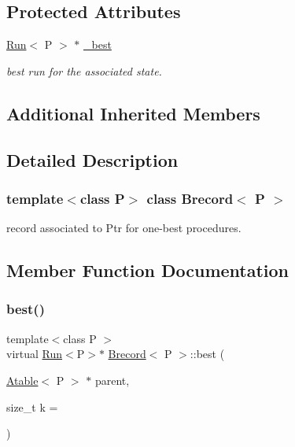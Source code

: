 \subsection*{Protected Attributes}
\begin{DoxyCompactItemize}
\item 
\mbox{\label{classBrecord_a88d1eeb254c1814f72f99a28bea5e7d6}} 
\mbox{\hyperlink{classRun}{Run}}$<$ P $>$ $\ast$ \mbox{\hyperlink{classBrecord_a88d1eeb254c1814f72f99a28bea5e7d6}{\+\_\+best}}
\begin{DoxyCompactList}\small\item\em best run for the associated state. \end{DoxyCompactList}\end{DoxyCompactItemize}
\subsection*{Additional Inherited Members}


\subsection{Detailed Description}
\subsubsection*{template$<$class P$>$\newline
class Brecord$<$ P $>$}

record associated to Ptr for one-\/best procedures. 

\subsection{Member Function Documentation}
\mbox{\label{classBrecord_a3e9776d16cdc2fd5c169d5599caf7c4b}} 
\subsubsection{\texorpdfstring{best()}{best()}}
{\footnotesize\ttfamily template$<$class P $>$ \\
virtual \mbox{\hyperlink{classRun}{Run}}$<$P$>$$\ast$ \mbox{\hyperlink{classBrecord}{Brecord}}$<$ P $>$\+::best (\begin{DoxyParamCaption}\item[{\mbox{\hyperlink{classAtable}{Atable}}$<$ P $>$ $\ast$}]{parent,  }\item[{size\+\_\+t}]{k = {} }\end{DoxyParamCaption})\hspace{0.3cm}{\ttfamily [virtual]}}



